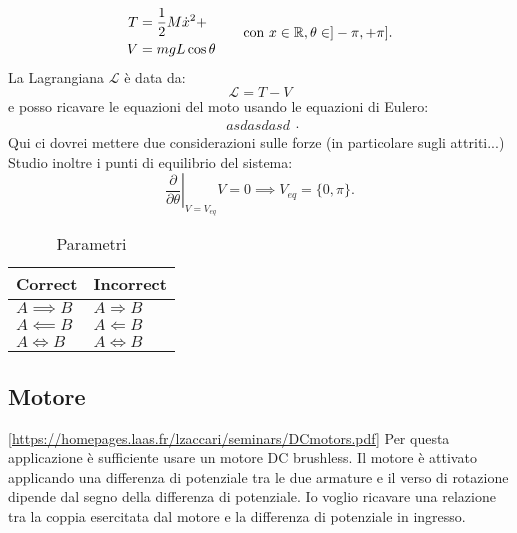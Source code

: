 \begin{equation*}
    \begin{aligned}
    T &= \frac 1 2 M  \dot x^2 +  \\ %
    V &= mgL \cos\theta
    \end{aligned}
    \hspace{20pt} \text{con } x \in \R, \theta \in ]-\pi, +\pi].
    \label{eq:energy}
\end{equation*}
La Lagrangiana $\mathcal L$ è data da:
\begin{equation*}
    \mathcal L = T - V
\end{equation*}
e posso ricavare le equazioni del moto usando le equazioni di Eulero:
\begin{equation*}
    \begin{aligned}
    asdasdasd %
    \end{aligned}.
\end{equation*}
Qui ci dovrei mettere due considerazioni sulle forze (in particolare sugli attriti...)
Studio inoltre i punti di equilibrio del sistema:
\begin{equation*}
    \left. \frac \partial {\partial \theta}\right |_{V=V_{eq}} V =  0 \implies V_{eq} = \{0, \pi\}.
\end{equation*}


\begin{table}[htbp]
    \centering
    \begin{tabular}{@{}ll@{}}
        \toprule
        \textbf{Correct}     & \textbf{Incorrect}         \\
        \midrule
        \( A \implies B \)   & \( A \Rightarrow B \)      \\
        \( A \impliedby B \) & \( A \Leftarrow B \)       \\
        \( A \iff B \)       & \( A \Leftrightarrow B \)  \\
        \bottomrule
    \end{tabular}
    \caption[Parametri]{Parametri}
    \label{tab:parametri}
\end{table}

\subsection{Motore}
\ref{https://homepages.laas.fr/lzaccari/seminars/DCmotors.pdf}
Per questa applicazione è sufficiente usare un motore DC brushless. Il motore è attivato applicando una differenza di potenziale tra le due armature e il verso di rotazione dipende dal segno della differenza di potenziale. Io voglio ricavare una relazione tra la coppia esercitata dal motore e la differenza di potenziale in ingresso.

